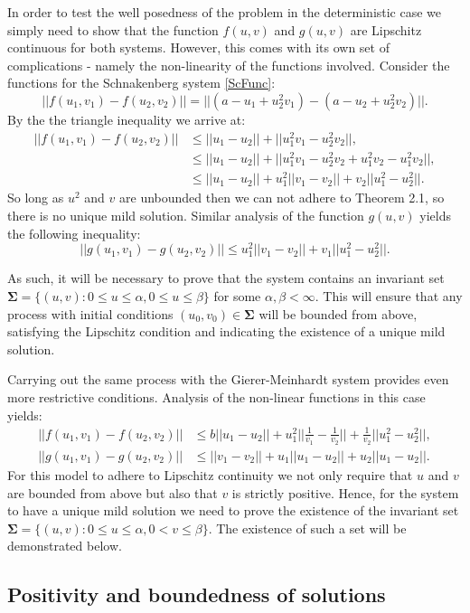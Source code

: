 \documentclass[12pt]{article}
\begin{document}
In order to test the well posedness of the problem in the deterministic case we simply need to show that the function $f(u,v)$ and $g(u,v)$ are Lipschitz continuous for both systems. However, this comes with its own set of complications - namely the non-linearity of the functions involved. Consider the functions for the Schnakenberg system \eqref{ScFunc}:
$$ ||f(u_1, v_1) - f(u_2,v_2)|| = ||(a-u_1+u_2^2v_1)-(a-u_2+u_2^2v_2)||.$$
By the the triangle inequality we arrive at:
\begin{align*}
||f(u_1,v_1) - f(u_2,v_2)|| &\leq ||u_1 - u_2|| + ||u_1^2v_1 - u_2^2v_2||,\\
    &\leq ||u_1 - u_2|| + ||u_1^2v_1 - u_2^2v_2 + u_1^2v_2 - u_1^2v_2||,\\
    &\leq ||u_1 - u_2|| + u_1^2||v_1 - v_2|| + v_2||u_1^2 - u_2^2||.
\end{align*}
So long as $u^2$ and $v$ are unbounded then we can not adhere to Theorem 2.1, so there is no unique mild solution. Similar analysis of the function $g(u,v)$ yields the following inequality:
$$ ||g(u_1,v_1) - g(u_2,v_2)|| \leq u_1^2||v_1 - v_2|| + v_1||u_1^2 - u_2^2||.$$

As such, it will be necessary to prove that the system contains an invariant set $\mathbf{\Sigma} = \lbrace (u,v) : 0\leq u \leq \alpha, 0\leq u \leq \beta\rbrace$ for some $\alpha, \beta < \infty$. This will ensure that any process with initial conditions $(u_0, v_0) \in \mathbf{\Sigma}$ will be bounded from above, satisfying the Lipschitz condition and indicating the existence of a unique mild solution.

Carrying out the same process with the Gierer-Meinhardt system provides even more restrictive conditions. Analysis of the non-linear functions in this case yields:
\begin{align*}
||f(u_1,v_1) - f(u_2,v_2)|| &\leq b||u_1 - u_2|| + u_1^2||\frac{1}{v_1} - \frac{1}{v_2}|| + \frac{1}{v_2}||u_1^2 - u_2^2||,\\
||g(u_1,v_1) - g(u_2,v_2)|| &\leq ||v_1 - v_2|| + u_1||u_1 - u_2||+ u_2||u_1 - u_2||.
\end{align*}
For this model to adhere to Lipschitz continuity we not only require that $u$ and $v$ are bounded from above but also that $v$ is strictly positive. Hence, for the system to have a unique mild solution we need to prove the existence of the invariant set $\mathbf{\Sigma} = \lbrace (u,v) : 0\leq u \leq \alpha, 0< v \leq \beta\rbrace$. The existence of such a set will be demonstrated below. 
\subsection{Positivity and boundedness of solutions}
\end{document}
